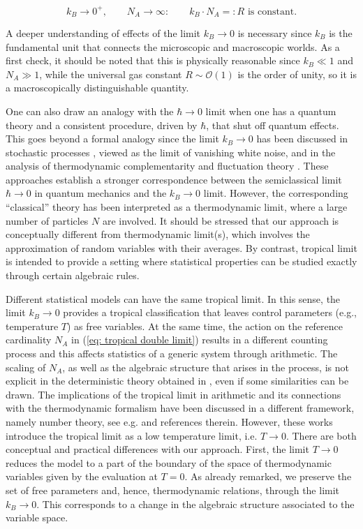 \documentclass[11pt,british,reqno]{article}
\numberwithin{equation}{section}
\numberwithin{figure}{section}
\numberwithin{table}{section}
\theoremstyle{definition}
\theoremstyle{definition}
\theoremstyle{plain}
\theoremstyle{plain}
\theoremstyle{remark}
\theoremstyle{plain}
\numberwithin{equation}{section}
\numberwithin{figure}{section}
\numberwithin{table}{section}
\theoremstyle{plain}
\begin{document}
\begin{equation}
k_{B}\rightarrow0^{+}, \qquad
N_{A}\rightarrow\infty: \qquad 
k_{B}\cdot N_{A}=:R \mbox{ is constant}.
\label{eq: tropical double limit}
\end{equation}

A deeper understanding of effects of the limit $k_{B}\rightarrow0$ is necessary since $k_{B}$ is the fundamental unit that connects the microscopic and macroscopic
worlds. As a first check, it should be noted that this is physically reasonable since $k_{B}\ll 1$ and $N_{A}\gg 1$, while the universal gas constant $R\sim\mathcal{O}(1)$ is the order of unity, so it is a macroscopically distinguishable quantity.

One can also draw an analogy with the $\hbar\rightarrow0$ limit
when one has a quantum theory and a consistent procedure, driven by
$\hbar$, that shut off quantum effects. This goes beyond a formal analogy since the limit $k_{B}\rightarrow 0$ has been discussed in stochastic processes \cite{Lavenda1982}, viewed as the limit of vanishing white noise, and in the analysis of thermodynamic complementarity and fluctuation theory \cite{Schlogl1988, VelazquezAbad2012}. These approaches establish a stronger correspondence between the  semiclassical limit $\hbar\rightarrow 0$ in quantum mechanics and the $k_{B}\rightarrow0$ limit. However, the corresponding ``classical'' theory has been interpreted as a thermodynamic limit, where a large number of particles $N$ are involved. It should be stressed that our approach is conceptually different from
thermodynamic limit(s), which involves the approximation of random
variables with their averages. By contrast, tropical limit is intended to provide a setting where statistical properties can be studied exactly through certain algebraic rules. 

Different statistical models can have the same tropical limit. In this sense, the limit $k_B\rightarrow 0$ provides a tropical classification that leaves control parameters (e.g., temperature $T$) as free variables. At the same time, the action on the reference cardinality $N_A$ in (\ref{eq: tropical double limit}) results in a different counting process and this affects statistics of a generic system through arithmetic. The scaling of $N_A$, as well as the algebraic structure that arises in the process, is not explicit in the deterministic theory obtained in \cite{Schlogl1988, VelazquezAbad2012}, even if some similarities can be drawn. The implications of the tropical limit in arithmetic and its connections with the thermodynamic formalism have been discussed in a different framework, namely number theory, see e.g. \cite{Marcolli2014} and references therein. However, these works introduce the tropical limit as a low temperature limit, i.e. $T\rightarrow 0$. There are both conceptual and practical differences with our approach. First, the limit $T\rightarrow 0 $ reduces the model to a part of the boundary of the space of thermodynamic variables given by the evaluation at $T=0$. As already remarked, we preserve the set of free parameters and, hence, thermodynamic relations, through the limit $k_B\rightarrow 0$. This corresponds to a change in the algebraic structure associated to the variable space. 
\end{document}
